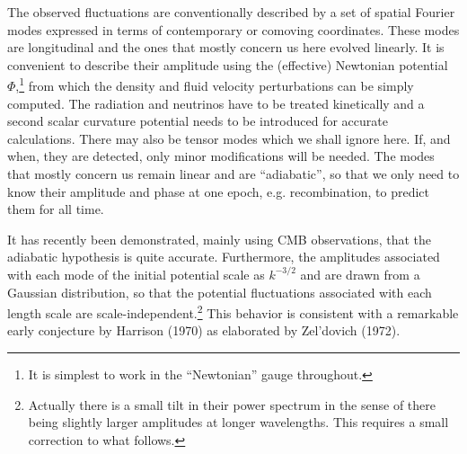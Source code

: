 \documentclass[psfig,11pt]{article}
\begin{document}
The observed fluctuations are conventionally described by a set of spatial Fourier modes expressed in terms of contemporary or comoving coordinates. These modes are longitudinal and the ones that mostly concern us here evolved linearly. It is convenient to describe their amplitude using the (effective) Newtonian potential $\Phi$,\footnote{It is simplest to work in the ``Newtonian'' gauge throughout.} from which the density and fluid velocity perturbations can be simply computed. The radiation and neutrinos have to be treated kinetically and a second scalar curvature potential needs to be introduced for accurate calculations. There may also be tensor modes which we shall ignore here. If, and when, they are detected, only minor modifications will be needed. The modes that mostly concern us remain linear and are ``adiabatic'', so that we only need to know their amplitude and phase at one epoch, e.g. recombination, to predict them for all time.

It has recently been demonstrated, mainly using CMB observations, that the adiabatic hypothesis is quite accurate. Furthermore, the amplitudes associated with each mode of the initial potential scale as $k^{-3/2}$ and are drawn from a Gaussian distribution, so that the potential fluctuations associated with each length scale are scale-independent.\footnote{Actually there is a small tilt in their power spectrum in the sense of there being slightly larger amplitudes at longer wavelengths. This requires a small correction to what follows.} This behavior is consistent with a remarkable early conjecture by Harrison (1970) as elaborated by Zel'dovich (1972). 
\end{document}
